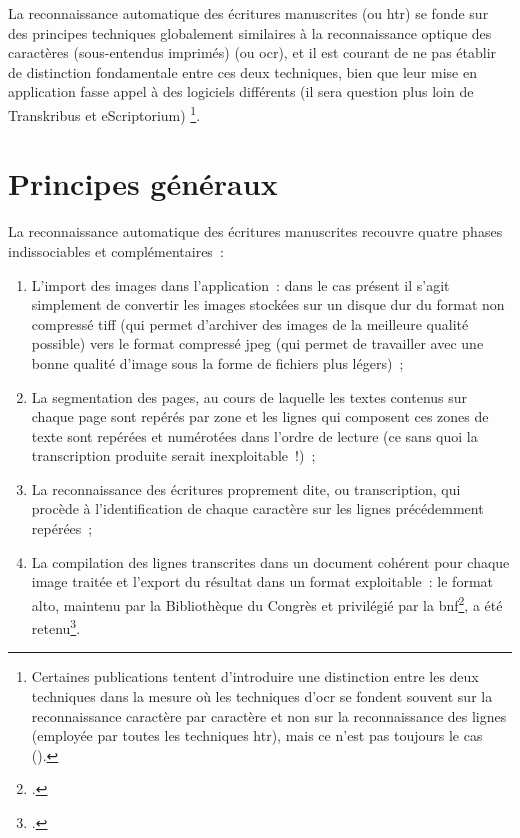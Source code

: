 \documentclass[a4paper,12pt,twoside]{book}
\begin{document}
		La reconnaissance automatique des écritures manuscrites (ou \gls{htr}) se fonde sur des principes techniques globalement similaires à la reconnaissance optique des caractères (sous-entendus imprimés) (ou \gls{ocr}), et il est courant de ne pas établir de distinction fondamentale entre ces deux techniques, bien que leur mise en application fasse appel à des logiciels différents (il sera question plus loin de Transkribus et eScriptorium)
		\footnote{Certaines publications tentent d'introduire une distinction entre les deux techniques dans la mesure où les techniques d'\gls{ocr} se fondent souvent sur la reconnaissance caractère par caractère et non sur la reconnaissance des lignes (employée par toutes les techniques \gls{htr}), mais ce n'est pas toujours le cas (\cite{stokesEScriptoriumVREManuscript2021}).}.
		
		\section{Principes généraux}
		
			La reconnaissance automatique des écritures manuscrites recouvre quatre phases indissociables et complémentaires~:
			
			\begin{enumerate}
				\item L'import des images dans l'application~: dans le cas présent il s'agit simplement de convertir les images stockées sur un disque dur du format non compressé \textsf{tiff} (qui permet d'archiver des images de la meilleure qualité possible) vers le format compressé \textsf{jpeg} (qui permet de travailler avec une bonne qualité d'image sous la forme de fichiers plus légers)~;
				\item La \gls{segmentation} des pages, au cours de laquelle les textes contenus sur chaque page sont repérés par zone et les lignes qui composent ces zones de texte sont repérées et numérotées dans l'ordre de lecture (ce sans quoi la transcription produite serait inexploitable~!)~;
				\item La reconnaissance des écritures proprement dite, ou transcription, qui procède à l'identification de chaque caractère sur les lignes précédemment repérées~;
				\item La compilation des lignes transcrites dans un document cohérent pour chaque image traitée et l'export du résultat dans un format exploitable~: le format \gls{alto}, maintenu par la Bibliothèque du Congrès et privilégié par la \gls{bnf}\footcite{TechniquesFormatsConversion2022}, a été retenu\footcite{stokesEScriptoriumVREManuscript2021}.
			\end{enumerate}
				
\end{document}
